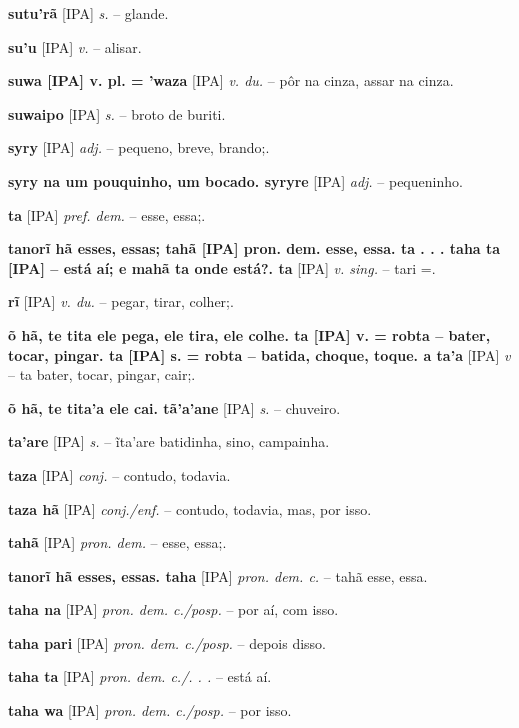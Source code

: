 \textbf{sutu'rã} [IPA] \textit{s.} -- glande.

\textbf{su'u} [IPA] \textit{v.} -- alisar.

\textbf{suwa [IPA] v. pl. = 'waza} [IPA] \textit{v. du.} -- pôr na cinza, assar na cinza.

\textbf{suwaipo} [IPA] \textit{s.} -- broto de buriti.

\textbf{syry} [IPA] \textit{adj.} -- pequeno, breve, brando;.

\textbf{syry na um pouquinho, um bocado. syryre} [IPA] \textit{adj.} -- pequeninho.   %

\textbf{ta} [IPA] \textit{pref. dem.} -- esse, essa;.

\textbf{tanorĩ hã esses, essas; tahã [IPA] pron. dem. esse, essa. ta . . . taha ta [IPA]  -- está aí; e mahã ta onde está?. ta} [IPA] \textit{v. sing.} -- tari =.

\textbf{rĩ} [IPA] \textit{v. du.} -- pegar, tirar, colher;.

\textbf{õ hã, te tita ele pega, ele tira, ele colhe. ta [IPA] v. = robta -- bater, tocar, pingar. ta [IPA] s. = robta -- batida, choque, toque. a ta'a} [IPA] \textit{v} -- ta bater, tocar, pingar, cair;.

\textbf{õ hã, te tita'a ele cai. tã'a'ane} [IPA] \textit{s.} -- chuveiro.

\textbf{ta'are} [IPA] \textit{s.} -- ĩta'are batidinha, sino, campainha.

\textbf{taza} [IPA] \textit{conj.} -- contudo, todavia.

\textbf{taza hã} [IPA] \textit{conj./enf.} -- contudo, todavia, mas, por isso.

\textbf{tahã} [IPA] \textit{pron. dem.} -- esse, essa;.

\textbf{tanorĩ hã esses, essas. taha} [IPA] \textit{pron. dem. c.} -- tahã esse, essa.

\textbf{taha na} [IPA] \textit{pron. dem. c./posp.} -- por aí, com isso.

\textbf{taha pari} [IPA] \textit{pron. dem. c./posp.} -- depois disso.

\textbf{taha ta} [IPA] \textit{pron. dem. c./. . .} -- está aí.

\textbf{taha wa} [IPA] \textit{pron. dem. c./posp.} -- por isso.

